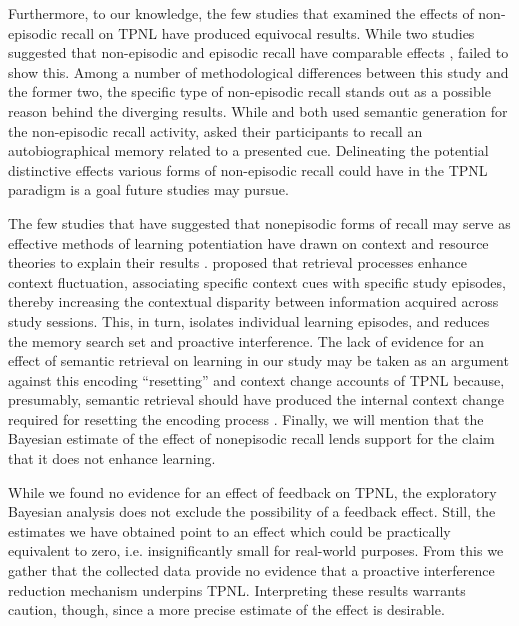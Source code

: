 \documentclass[../main.tex]{subfiles}
\begin{document}
Furthermore, to our knowledge, the few studies that examined the effects of 
non-episodic recall on TPNL have produced equivocal results. While two studies 
suggested that non-episodic and episodic recall have comparable effects
\citep{divisRetrievalSpeedsContext2014, 
pastotterRetrievalLearningFacilitates2011}, \cite{weinsteinNotAllRetrieval2015} 
failed to show this. Among a number of methodological differences between this 
study and the former two, the specific type of non-episodic recall stands out 
as a possible reason behind the diverging results. While 
\cite{pastotterRetrievalLearningFacilitates2011} and 
\cite{divisRetrievalSpeedsContext2014} both used semantic generation for the 
non-episodic recall activity, \cite{weinsteinNotAllRetrieval2015} asked their 
participants to recall an autobiographical memory related to a presented cue. 
Delineating the potential distinctive effects various forms of non-episodic 
recall could have in the TPNL paradigm is a goal future studies may pursue.

The few studies that have suggested that nonepisodic forms of recall may serve 
as effective methods of learning potentiation have drawn on context and resource
theories to explain their results \citep{divisRetrievalSpeedsContext2014, 
pastotterRetrievalLearningFacilitates2011}. 
\cite{divisRetrievalSpeedsContext2014} proposed that retrieval processes 
enhance context fluctuation, associating specific context cues with specific 
study episodes, thereby increasing the contextual disparity between information 
acquired across study sessions. This, in turn, isolates individual learning 
episodes, and reduces the memory search set and proactive interference.
The lack of evidence for an effect of semantic retrieval 
on learning in our study may be taken as an argument against this encoding 
``resetting'' and context change accounts of TPNL because, presumably, semantic 
retrieval should have produced the internal context change required for 
resetting the encoding process 
\citep{pastotterRetrievalLearningFacilitates2011}. Finally, we will mention that
the Bayesian estimate of the effect of nonepisodic recall lends support for the
claim that it does not enhance learning.

While we found no evidence for an effect of feedback on TPNL, the exploratory 
Bayesian analysis does not exclude the possibility of a feedback effect. Still, 
the estimates we have obtained point to an effect which could be practically 
equivalent to zero, i.e. insignificantly small for real-world purposes.
From this we gather that the collected data provide no evidence that a 
proactive interference reduction mechanism underpins TPNL. Interpreting these 
results warrants caution, though, since a more precise estimate of the effect 
is desirable.
\end{document}
